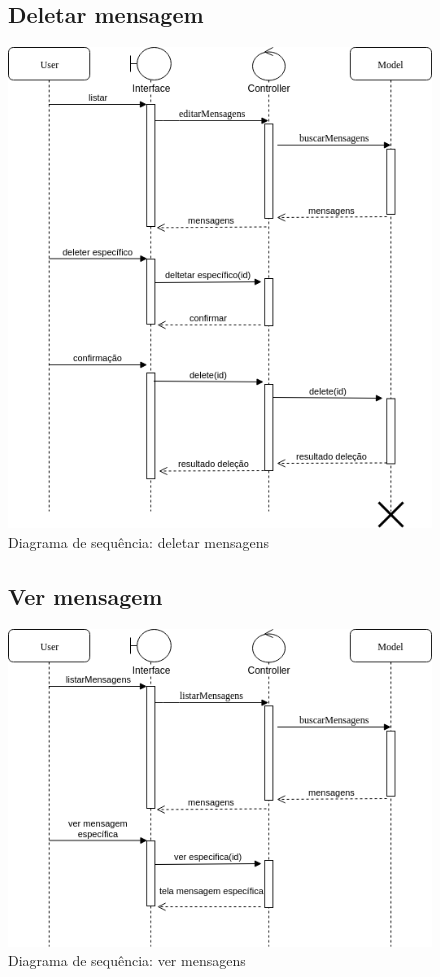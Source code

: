 \documentclass[
	12pt,				%
	openright,			%
	oneside,			%
	a4paper,			%
	english,			%
	french,				%
	spanish,			%
	brazil				%
]{abntex2}
\begin{document}
\begin{figure}
	\label{figure_diagrama_sequencia_deletar_mensagem}
	\subsection{Deletar mensagem}	
	\includegraphics[scale=0.6]{SequenceMensagens/DeleteMessageSequence.png}
	\caption{Diagrama de sequência: deletar mensagens}
	\hfill
\end{figure}
%
\begin{figure}[h]	
	\label{figure_diagrama_sequencia_ver_mensagem}	
	\subsection{Ver mensagem}
	\includegraphics[scale=0.6]{SequenceMensagens/VerMensagensSequence.png}
	\caption{Diagrama de sequência: ver mensagens}
	\hfill
\end{figure}
\end{document}
